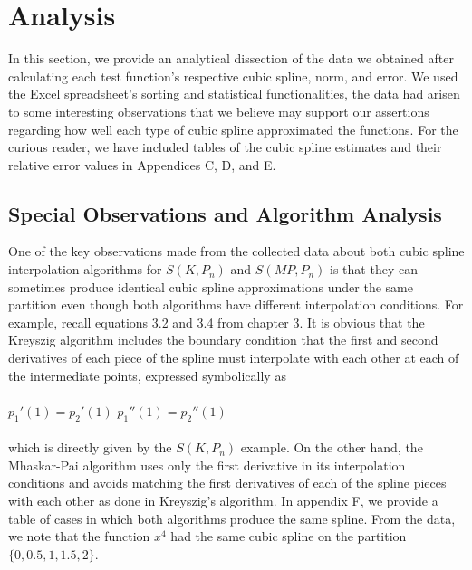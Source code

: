 

\chapter{Analysis}
\label{chapter5}
\thispagestyle{empty}

In this section, we provide an analytical dissection of the data we obtained after calculating each test function's respective cubic spline, norm, and error. We used the Excel spreadsheet's sorting and statistical functionalities, the data had arisen to some interesting observations that we believe may support our assertions regarding how well each type of cubic spline approximated the functions. For the curious reader, we have included tables of the cubic spline estimates and their relative error values in Appendices C, D, and E.

\section{Special Observations and Algorithm Analysis}
One of the key observations made from the collected data about both cubic spline interpolation algorithms for $S(K, P_{n})$ and $S(MP, P_{n})$ is that they can sometimes produce identical cubic spline approximations under the same partition even though both algorithms have different interpolation conditions. For example, recall equations 3.2 and 3.4 from chapter 3. It is obvious that the Kreyszig algorithm includes the boundary condition that the first and second derivatives of each piece of the spline must interpolate with each other at each of the intermediate points, expressed symbolically as\\\\
$p_{1}'(1) = p_{2}'(1)$ 
$p_{1}''(1) = p_{2}''(1)$\\\\
which is directly given by the $S(K, P_{n})$ example. On the other hand, the Mhaskar-Pai algorithm uses only the first derivative in its interpolation conditions and avoids matching the first derivatives of each of the spline pieces with each other as done in Kreyszig's algorithm. In appendix F, we provide a table of cases in which both algorithms produce the same spline. From the data, we note that the function $x^4$ had the same cubic spline on the partition $\{0,0.5,1,1.5,2\}$.

